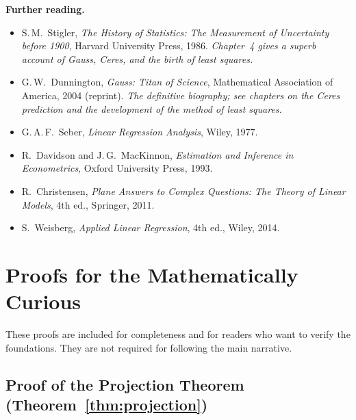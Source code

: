 \bigskip
\noindent\textbf{Further reading.}
\begin{itemize}[nosep]
  \item S.\,M.\ Stigler, \emph{The History of Statistics: The Measurement of
        Uncertainty before 1900}, Harvard University Press, 1986.
        \textit{Chapter~4 gives a superb account of Gauss, Ceres, and the
        birth of least squares.}
  \item G.\,W.\ Dunnington, \emph{Gauss: Titan of Science}, Mathematical
        Association of America, 2004 (reprint).
        \textit{The definitive biography; see chapters on the Ceres
        prediction and the development of the method of least squares.}
  \item G.\,A.\,F.\ Seber, \emph{Linear Regression Analysis}, Wiley, 1977.
  \item R.\ Davidson and J.\,G.\ MacKinnon, \emph{Estimation and Inference
        in Econometrics}, Oxford University Press, 1993.
  \item R.\ Christensen, \emph{Plane Answers to Complex Questions: The Theory
        of Linear Models}, 4th ed., Springer, 2011.
  \item S.\ Weisberg, \emph{Applied Linear Regression}, 4th ed., Wiley, 2014.
\end{itemize}


\appendix
\section{Proofs for the Mathematically Curious}\label{app:proofs}

These proofs are included for completeness and for readers who want
to verify the foundations. They are not required for following the
main narrative.


\subsection{Proof of the Projection Theorem (Theorem~\ref{thm:projection})}

